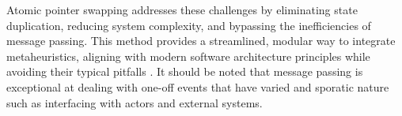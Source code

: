 Atomic pointer swapping addresses these challenges by eliminating state
duplication, reducing system complexity, and bypassing the inefficiencies of
message passing. This method provides a streamlined, modular way to integrate
metaheuristics, aligning with modern software architecture principles while
avoiding their typical pitfalls \citep{richards_fundamentals_2020}. It should
be noted that message passing is exceptional at dealing with one-off events that
have varied and sporatic nature such as interfacing with actors and external
systems.

